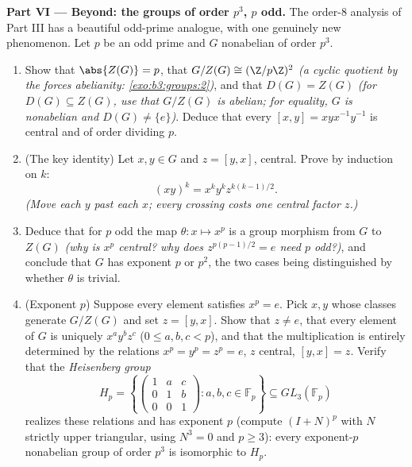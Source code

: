 \begin{problem}
\medskip
\noindent\textbf{Part VI --- Beyond: the groups of order $p^3$,
$p$ odd.} The order-$8$ analysis of Part III has a beautiful
odd-prime analogue, with one genuinely new phenomenon. Let $p$ be
an odd prime and $G$ nonabelian of order $p^3$.
\begin{enumerate}[resume]
  \item Show that $\abs{Z(G)} = p$, that $G/Z(G) \cong
        (\Z/p\Z)^2$ \emph{(a cyclic quotient by the  forces
        abelianity: \cref{exo:b3:groups:2})}, and that $D(G) =
        Z(G)$ \emph{(for $D(G) \subseteq Z(G)$, use that
        $G/Z(G)$ is abelian; for equality, $G$ is nonabelian and
        $D(G) \neq \{e\}$)}. Deduce that every 
        $[x, y] = xyx^{-1}y^{-1}$ is central and of order
        dividing $p$.
  \item (The key identity) Let $x, y \in G$ and $z = [y, x]$,
        central. Prove by induction on $k$:
        \[
        (xy)^k = x^k y^k z^{k(k-1)/2} .
        \]
        \emph{(Move each $y$ past each $x$; every crossing costs
        one central factor $z$.)}
  \item Deduce that for $p$ odd the map $\theta\colon x \mapsto
        x^p$ is a group morphism from $G$ to $Z(G)$ \emph{(why is
        $x^p$ central? why does $z^{p(p-1)/2} = e$ need $p$
        odd?)}, and conclude that $G$ has exponent $p$ or $p^2$,
        the two cases being distinguished by whether $\theta$ is
        trivial.
  \item (Exponent $p$) Suppose every element satisfies $x^p = e$.
        Pick $x, y$ whose classes generate $G/Z(G)$ and set $z =
        [y, x]$. Show that $z \neq e$, that every element of $G$
        is uniquely $x^ay^bz^c$ ($0 \leq a, b, c < p$), and that
        the multiplication is entirely determined by the
        relations $x^p = y^p = z^p = e$, $z$ central, $[y, x] =
        z$. Verify that the \emph{Heisenberg group}
        \[
        H_p = \left\{
        \begin{pmatrix} 1 & a & c\\ 0 & 1 & b\\ 0 & 0 & 1
        \end{pmatrix} : a, b, c \in \mathbb F_p \right\}
        \subseteq GL_3(\mathbb F_p)
        \]
        realizes these relations and has exponent $p$ (compute
        $(I + N)^p$ with $N$ strictly upper triangular, using
        $N^3 = 0$ and $p \geq 3$): every exponent-$p$ nonabelian
        group of order $p^3$ is isomorphic to $H_p$.

\end{enumerate}
\end{problem}

